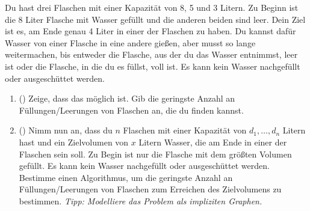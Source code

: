 \documentclass{uebung_cs}
\begin{document}
\begin{aufgabe}
Du hast drei Flaschen mit einer Kapazität von 8, 5 und 3 Litern.
Zu Beginn ist die 8 Liter Flasche mit Wasser gefüllt und die anderen beiden sind leer.
Dein Ziel ist es, am Ende genau 4 Liter in einer der Flaschen zu haben. Du kannst dafür Wasser von einer Flasche in eine andere gießen, aber musst so lange weitermachen, bis entweder die Flasche, aus der du das Wasser entnimmst, leer ist oder die Flasche, in die du es füllst, voll ist.
Es kann kein Wasser nachgefüllt oder ausgeschüttet werden.
\begin{enumerate}
	\item (\hard) Zeige, dass das möglich ist. Gib die geringste Anzahl an Füllungen/Leerungen von Flaschen an, die du finden kannst.
	\item (\hard) Nimm nun an, dass du $n$ Flaschen mit einer Kapazität von $d_1, \ldots, d_n$ Litern hast und ein Zielvolumen von $x$ Litern Wasser, die am Ende in einer der Flaschen sein soll.
	Zu Begin ist nur die Flasche mit dem größten Volumen gefüllt.
	Es kann kein Wasser nachgefüllt oder ausgeschüttet werden.\\
	Bestimme einen Algorithmus, um die geringste Anzahl an Füllungen/Leerungen von Flaschen zum Erreichen des Zielvolumens zu bestimmen.
	\textit{Tipp: Modelliere das Problem als impliziten Graphen.}
\end{enumerate}
\end{aufgabe}
\end{document}
